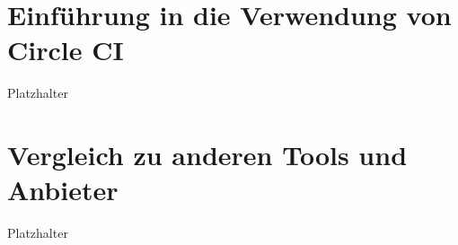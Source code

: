 \documentclass{article}
\begin{document}
\section{Einführung in die Verwendung von Circle CI}
Platzhalter

\section {Vergleich zu anderen Tools und Anbieter}
Platzhalter
\end{document}
